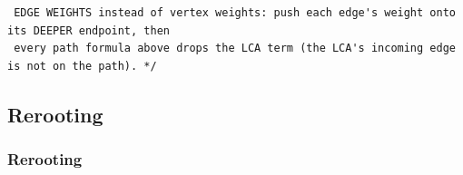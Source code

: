 \documentclass[9pt,a4paper,twocolumn]{extarticle}
\begin{document}
\begin{lstlisting}
 EDGE WEIGHTS instead of vertex weights: push each edge's weight onto its DEEPER endpoint, then
 every path formula above drops the LCA term (the LCA's incoming edge is not on the path). */
\end{lstlisting}

\subsection{Rerooting}

\filbreak
\subsubsection{Rerooting}
\nopagebreak
\end{document}
